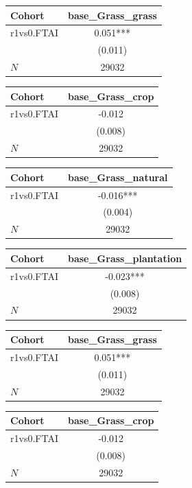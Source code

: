 {
\def\sym#1{\ifmmode^{#1}\else\(^{#1}\)\fi}
\begin{tabular}{l*{1}{c}}
\toprule
Cohort    &base\_Grass\_grass   \\
\midrule
r1vs0.FTAI&    0.051***\\
          &  (0.011)   \\
\midrule
\(N\)     &    29032   \\
\bottomrule
\end{tabular}
}
{
\def\sym#1{\ifmmode^{#1}\else\(^{#1}\)\fi}
\begin{tabular}{l*{1}{c}}
\toprule
Cohort    &base\_Grass\_crop   \\
\midrule
r1vs0.FTAI&   -0.012   \\
          &  (0.008)   \\
\midrule
\(N\)     &    29032   \\
\bottomrule
\end{tabular}
}
{
\def\sym#1{\ifmmode^{#1}\else\(^{#1}\)\fi}
\begin{tabular}{l*{1}{c}}
\toprule
Cohort    &base\_Grass\_natural   \\
\midrule
r1vs0.FTAI&   -0.016***\\
          &  (0.004)   \\
\midrule
\(N\)     &    29032   \\
\bottomrule
\end{tabular}
}
{
\def\sym#1{\ifmmode^{#1}\else\(^{#1}\)\fi}
\begin{tabular}{l*{1}{c}}
\toprule
Cohort    &base\_Grass\_plantation   \\
\midrule
r1vs0.FTAI&   -0.023***\\
          &  (0.008)   \\
\midrule
\(N\)     &    29032   \\
\bottomrule
\end{tabular}
}
{
\def\sym#1{\ifmmode^{#1}\else\(^{#1}\)\fi}
\begin{tabular}{l*{1}{c}}
\toprule
Cohort    &base\_Grass\_grass   \\
\midrule
r1vs0.FTAI&    0.051***\\
          &  (0.011)   \\
\midrule
\(N\)     &    29032   \\
\bottomrule
\end{tabular}
}
{
\def\sym#1{\ifmmode^{#1}\else\(^{#1}\)\fi}
\begin{tabular}{l*{1}{c}}
\toprule
Cohort    &base\_Grass\_crop   \\
\midrule
r1vs0.FTAI&   -0.012   \\
          &  (0.008)   \\
\midrule
\(N\)     &    29032   \\
\bottomrule
\end{tabular}
}

